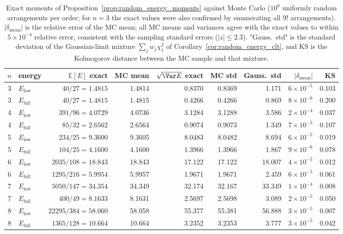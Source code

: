 \begin{table}[t]
\centering
\small
\begin{tabular}{c l r r r r r r r}
\toprule
$n$ & energy & $\mathbb{E}[E]$ exact & MC mean & $\sqrt{\Var E}$ exact & MC std & Gauss.\ std & $|\delta_{\mathrm{mean}}|$ & KS \\
\midrule
3 & $E_{\mathrm{low}}$  & $40/27=1.4815$ & 1.4814 & 0.8370 & 0.8369 & 1.171 & $6\times10^{-5}$ & 0.103 \\
3 & $E_{\mathrm{full}}$ & $40/27=1.4815$ & 1.4815 & 0.4266 & 0.4266 & 0.869 & $8\times10^{-6}$ & 0.200 \\
4 & $E_{\mathrm{low}}$  & $391/96=4.0729$ & 4.0736 & 3.1284 & 3.1288 & 3.586 & $2\times10^{-4}$ & 0.037 \\
4 & $E_{\mathrm{full}}$ & $85/32=2.6562$ & 2.6564 & 0.9074 & 0.9073 & 1.349 & $7\times10^{-5}$ & 0.107 \\
5 & $E_{\mathrm{low}}$  & $234/25=9.3600$ & 9.3605 & 8.0483 & 8.0482 & 8.694 & $6\times10^{-5}$ & 0.019 \\
5 & $E_{\mathrm{full}}$ & $104/25=4.1600$ & 4.1600 & 1.3966 & 1.3966 & 1.867 & $9\times10^{-6}$ & 0.078 \\
6 & $E_{\mathrm{low}}$  & $2035/108=18.843$ & 18.843 & 17.122 & 17.122 & 18.007 & $4\times10^{-5}$ & 0.012 \\
6 & $E_{\mathrm{full}}$ & $1295/216=5.9954$ & 5.9957 & 1.9671 & 1.9671 & 2.459 & $6\times10^{-5}$ & 0.061 \\
7 & $E_{\mathrm{low}}$  & $5050/147=34.354$ & 34.349 & 32.174 & 32.167 & 33.349 & $1\times10^{-4}$ & 0.008 \\
7 & $E_{\mathrm{full}}$ & $400/49=8.1633$ & 8.1631 & 2.5697 & 2.5698 & 3.089 & $2\times10^{-5}$ & 0.050 \\
8 & $E_{\mathrm{low}}$  & $22295/384=58.060$ & 58.058 & 55.377 & 55.381 & 56.888 & $3\times10^{-5}$ & 0.007 \\
8 & $E_{\mathrm{full}}$ & $1365/128=10.664$ & 10.664 & 3.2352 & 3.2353 & 3.777 & $3\times10^{-5}$ & 0.042 \\
\bottomrule
\end{tabular}
\caption{Exact moments of Proposition~\ref{prop:random_energy_moments} against Monte Carlo
($10^8$ uniformly random arrangements per order; for $n=3$ the exact values were also confirmed by
enumerating all $9!$ arrangements). $|\delta_{\mathrm{mean}}|$ is the relative error of the MC mean;
all MC means and variances agree with the exact values to within $5\times10^{-4}$ relative error,
consistent with the sampling standard errors ($|z|\le 2.3$). "Gauss.\ std" is the standard deviation
of the Gaussian-limit mixture $\sum_j w_j\chi^2_1$ of Corollary~\ref{cor:random_energy_clt}, and KS
is the Kolmogorov distance between the MC sample and that mixture.}
\label{tab:random_energy}
\end{table}

